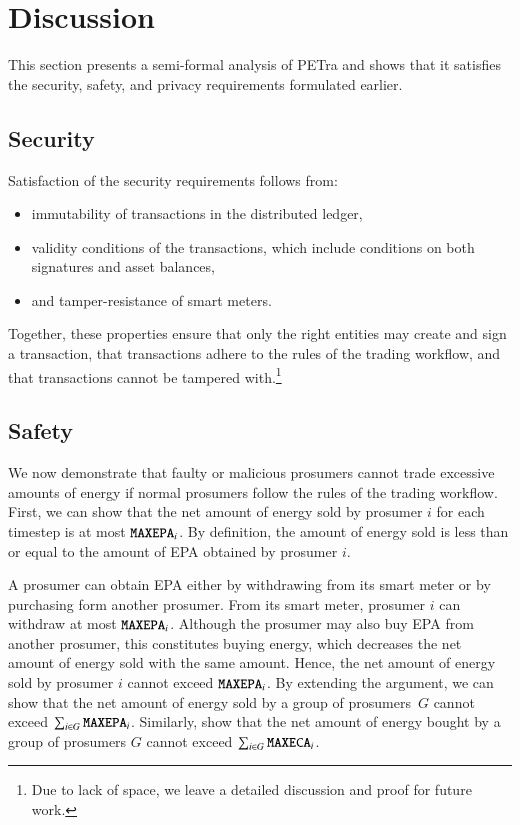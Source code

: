 \section{Discussion}
\label{sec:discussion}

This section presents a semi-formal analysis of PETra and shows that
it satisfies the security, safety, and privacy requirements formulated
earlier.

\subsection{Security}
Satisfaction of the security requirements follows from:
\begin{itemize}[noitemsep,topsep=-\parskip]
\item immutability of transactions in the distributed ledger,
\item validity conditions of the transactions, which include
  conditions on both signatures and asset balances,
\item and tamper-resistance of smart meters.
\end{itemize}
Together, these properties ensure that only the right entities may
create and sign a transaction, that transactions adhere to the rules
of the trading workflow, and that transactions cannot be tampered
with.\footnote{Due to lack of space, we leave a detailed discussion
  and proof for future work.}

\subsection{Safety}
We now demonstrate that faulty or malicious prosumers cannot trade
excessive amounts of energy if normal prosumers follow the rules of
the trading workflow.  First, we can show that the net amount of
energy sold by prosumer $i$ for each timestep is at most
$\texttt{MAXEPA}_i$.  By definition, the amount of energy sold is less
than or equal to the amount of EPA obtained by prosumer $i$.

A prosumer can obtain EPA either by withdrawing from its smart meter
or by purchasing form another prosumer.  From its smart meter,
prosumer $i$ can withdraw at most $\texttt{MAXEPA}_i$.  Although the
prosumer may also buy EPA from another prosumer, this constitutes
buying energy, which decreases the net amount of energy sold with the
same amount.  Hence, the net amount of energy sold by prosumer $i$
cannot exceed $\texttt{MAXEPA}_i$.  By extending the argument, we can
show that the net amount of energy sold by a group of prosumers~$G$
cannot exceed $\sum_{i \in G} \texttt{MAXEPA}_i$.  Similarly, %
show that the net amount of energy bought by a group of prosumers $G$
cannot exceed $\sum_{i \in G} \texttt{MAXECA}_i$.

